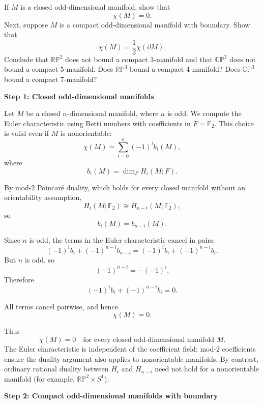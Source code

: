 \begin{problem}
If \(M\) is a closed odd-dimensional manifold, show that
\[
\chi(M)=0.
\]
Next, suppose \(M\) is a compact odd-dimensional manifold with boundary. Show
that
\[
\chi(M)=\frac{1}{2}\chi(\partial M).
\]
Conclude that \(\mathbb{RP}^2\) does not bound a compact \(3\)-manifold and that
\(\mathbb{CP}^2\) does not bound a compact \(5\)-manifold. Does
\(\mathbb{RP}^3\) bound a compact \(4\)-manifold? Does \(\mathbb{CP}^3\) bound a
compact \(7\)-manifold?

\par

\noindent
\end{problem}

\begin{solution}

\medskip
\noindent\textbf{Step 1: Closed odd-dimensional manifolds}\par
\smallskip


Let \(M\) be a closed \(n\)-dimensional manifold, where \(n\) is odd. We compute
the Euler characteristic using Betti numbers with coefficients in \(F=\mathbb F_2\). This choice is valid even if \(M\) is nonorientable:
\[
\chi(M)=\sum_{i=0}^n (-1)^i b_i(M),
\]
where
\[
b_i(M)=\dim_F H_i(M;F).
\]

By mod-\(2\) Poincar\'e duality, which holds for every closed manifold without an orientability assumption,
\[
H_i(M;\mathbb F_2)\cong H_{n-i}(M;\mathbb F_2),
\]
so
\[
b_i(M)=b_{n-i}(M).
\]

Since \(n\) is odd, the terms in the Euler characteristic cancel in pairs:
\[
(-1)^i b_i + (-1)^{n-i}b_{n-i}
=
(-1)^i b_i + (-1)^{n-i}b_i.
\]
But \(n\) is odd, so
\[
(-1)^{n-i}=-(-1)^i.
\]
Therefore
\[
(-1)^i b_i + (-1)^{n-i}b_i=0.
\]

All terms cancel pairwise, and hence
\[
\chi(M)=0.
\]

Thus
\[
\boxed{
	\chi(M)=0
	\quad
	\text{for every closed odd-dimensional manifold }M.
}
\]
\noindent The Euler characteristic is independent of the coefficient field; mod-\(2\) coefficients ensure the duality argument also applies to nonorientable manifolds. By contrast, ordinary rational duality between \(H_i\) and \(H_{n-i}\) need not hold for a nonorientable manifold (for example, \(\mathbb{RP}^2\times S^1\)).


\medskip
\noindent\textbf{Step 2: Compact odd-dimensional manifolds with boundary}\par
\smallskip



\end{solution}
